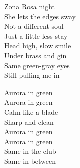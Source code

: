 \begin{lyrics}
Zona Rosa night\\
She lets the edges sway\\
Not a different soul\\
Just a little less stay\\
Head high, slow smile\\
Under brass and gin\\
Same green-gray eyes\\
Still pulling me in

Aurora in green\\
Aurora in green\\
Calm like a blade\\
Sharp and clean\\
Aurora in green\\
Aurora in green\\
Same in the club\\
Same in between
\end{lyrics}
